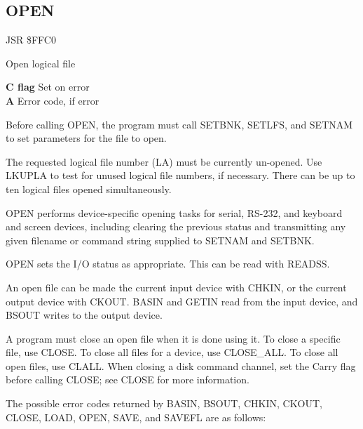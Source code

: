 \subsection{OPEN}
\label{KERNAL Jump Table!OPEN}
\begin{description}[leftmargin=2cm,style=nextline]
    \item [Address:] JSR \$FFC0
    \item [Description:] Open logical file
    \item [Outputs:]
        \textbf{C flag} Set on error \\
        \textbf{A} Error code, if error
    \item [Remarks:]
        Before calling OPEN, the program must call SETBNK, SETLFS, and SETNAM to set parameters for the file to open.

        The requested logical file number (LA) must be currently un-opened. Use LKUPLA to test for unused logical file numbers, if necessary. There can be up to ten logical files opened simultaneously.

        OPEN performs device-specific opening tasks for serial, RS-232, and keyboard and screen devices, including clearing the previous status and transmitting any given filename or command string supplied to SETNAM and SETBNK.

        OPEN sets the I/O status as appropriate. This can be read with READSS.

        An open file can be made the current input device with CHKIN, or the current output device with CKOUT. BASIN and GETIN read from the input device, and BSOUT writes to the output device.

        A program must close an open file when it is done using it. To close a specific file, use CLOSE. To close all files for a device, use CLOSE\_ALL. To close all open files, use CLALL. When closing a disk command channel, set the Carry flag before calling CLOSE; see CLOSE for more information.

        The possible error codes returned by BASIN, BSOUT, CHKIN, CKOUT, CLOSE, LOAD, OPEN, SAVE, and SAVEFL are as follows:


\end{description}
